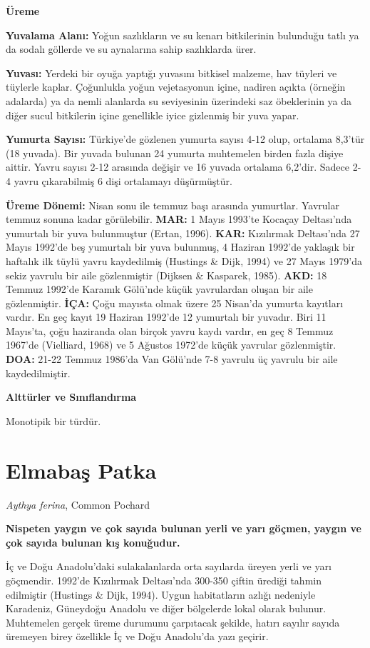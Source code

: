 \documentclass[
  a4paper,
  DIV=11,
  numbers=noendperiod]{scrreprt}
\begin{document}
\textbf{Üreme}

\textbf{Yuvalama Alanı:} Yoğun sazlıkların ve su kenarı bitkilerinin
bulunduğu tatlı ya da sodalı göllerde ve su aynalarına sahip sazlıklarda
ürer.

\textbf{Yuvası:} Yerdeki bir oyuğa yaptığı yuvasını bitkisel malzeme,
hav tüyleri ve tüylerle kaplar. Çoğunlukla yoğun vejetasyonun içine,
nadiren açıkta (örneğin adalarda) ya da nemli alanlarda su seviyesinin
üzerindeki saz öbeklerinin ya da diğer sucul bitkilerin içine genellikle
iyice gizlenmiş bir yuva yapar.

\textbf{Yumurta Sayısı:} Türkiye'de gözlenen yumurta sayısı 4-12 olup,
ortalama 8,3'tür (18 yuvada). Bir yuvada bulunan 24 yumurta muhtemelen
birden fazla dişiye aittir. Yavru sayısı 2-12 arasında değişir ve 16
yuvada ortalama 6,2'dir. Sadece 2-4 yavru çıkarabilmiş 6 dişi ortalamayı
düşürmüştür.

\textbf{Üreme Dönemi:} Nisan sonu ile temmuz başı arasında yumurtlar.
Yavrular temmuz sonuna kadar görülebilir. \textbf{MAR:} 1 Mayıs 1993'te
Kocaçay Deltası'nda yumurtalı bir yuva bulunmuştur (Ertan, 1996).
\textbf{KAR:} Kızılırmak Deltası'nda 27 Mayıs 1992'de beş yumurtalı bir
yuva bulunmuş, 4 Haziran 1992'de yaklaşık bir haftalık ilk tüylü yavru
kaydedilmiş (Hustings \& Dijk, 1994) ve 27 Mayıs 1979'da sekiz yavrulu
bir aile gözlenmiştir (Dijksen \& Kasparek, 1985). \textbf{AKD:} 18
Temmuz 1992'de Karamık Gölü'nde küçük yavrulardan oluşan bir aile
gözlenmiştir. \textbf{İÇA:} Çoğu mayısta olmak üzere 25 Nisan'da yumurta
kayıtları vardır. En geç kayıt 19 Haziran 1992'de 12 yumurtalı bir
yuvadır. Biri 11 Mayıs'ta, çoğu haziranda olan birçok yavru kaydı
vardır, en geç 8 Temmuz 1967'de (Vielliard, 1968) ve 5 Ağustos 1972'de
küçük yavrular gözlenmiştir. \textbf{DOA:} 21-22 Temmuz 1986'da Van
Gölü'nde 7-8 yavrulu üç yavrulu bir aile kaydedilmiştir.

\textbf{Alttürler ve Sınıflandırma}

Monotipik bir türdür.

\section{Elmabaş Patka}\label{elmabaux15f-patka}

\emph{Aythya ferina}, Common Pochard

\textbf{Nispeten yaygın ve çok sayıda bulunan yerli ve yarı göçmen,
yaygın ve çok sayıda bulunan kış konuğudur.}

İç ve Doğu Anadolu'daki sulakalanlarda orta sayılarda üreyen yerli ve
yarı göçmendir. 1992'de Kızılırmak Deltası'nda 300-350 çiftin ürediği
tahmin edilmiştir (Hustings \& Dijk, 1994). Uygun habitatların azlığı
nedeniyle Karadeniz, Güneydoğu Anadolu ve diğer bölgelerde lokal olarak
bulunur. Muhtemelen gerçek üreme durumunu çarpıtacak şekilde, hatırı
sayılır sayıda üremeyen birey özellikle İç ve Doğu Anadolu'da yazı
geçirir.
\end{document}

